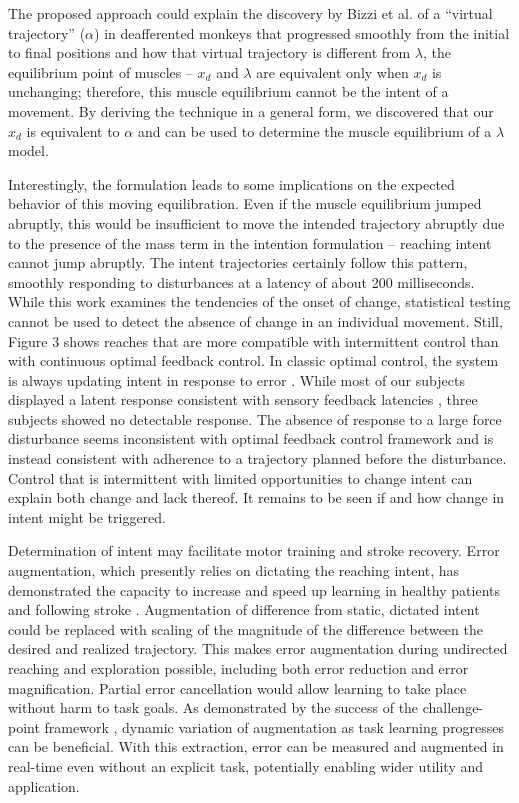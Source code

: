 The proposed approach could explain the discovery by Bizzi et al. \cite{bizzi1984posture} of a ``virtual trajectory'' ($\alpha$) in deafferented monkeys that progressed smoothly from the initial to final positions and how that virtual trajectory is different from $\lambda$, the equilibrium point of muscles -- $x_d$ and $\lambda$ are equivalent only when $x_d$ is unchanging; therefore, this muscle equilibrium cannot be the intent of a movement. By deriving the technique in a general form, we discovered that our $x_d$ is equivalent to $\alpha$ and can be used to determine the muscle equilibrium of a $\lambda$ model.

Interestingly, the formulation leads to some implications on the expected behavior of this moving equilibration. Even if the muscle equilibrium jumped abruptly, this would be insufficient to move the intended trajectory abruptly due to the presence of the mass term in the intention formulation -- reaching intent cannot jump abruptly. The intent trajectories certainly follow this pattern, smoothly responding to disturbances at a latency of about 200 milliseconds. While this work examines the tendencies of the onset of change, statistical testing cannot be used to detect the absence of change in an individual movement. Still, Figure 3 shows reaches that are more compatible with intermittent control than with continuous optimal feedback control. In classic optimal control, the system is always updating intent in response to error \cite{todorov2002optimal}. While most of our subjects displayed a latent response consistent with sensory feedback latencies \cite{pruszynski2012optimal}, three subjects showed no detectable response. The absence of response to a large force disturbance seems inconsistent with optimal feedback control framework and is instead consistent with adherence to a trajectory planned before the disturbance. Control that is intermittent \cite{gawthrop2011intermittent} with limited opportunities to change intent can explain both change and lack thereof. It remains to be seen if and how change in intent might be triggered.

Determination of intent may facilitate motor training and stroke recovery. Error augmentation, which presently relies on dictating the reaching intent, has demonstrated the capacity to increase and speed up learning in healthy patients \cite{patton2004robot} and following stroke \cite{patton2006evaluation}. Augmentation of difference from static, dictated intent could be replaced with scaling of the magnitude of the difference between the desired and realized trajectory. This makes error augmentation during undirected reaching and exploration possible, including both error reduction and error magnification. Partial error cancellation would allow learning to take place without harm to task goals. As demonstrated by the success of the challenge-point framework \cite{guadagnoli2004challenge}, dynamic variation of augmentation as task learning progresses can be beneficial. With this extraction, error can be measured and augmented in real-time even without an explicit task, potentially enabling wider utility and application. 

